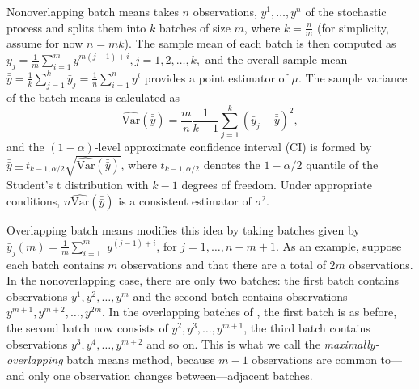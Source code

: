 \documentclass[12pt]{article}
\newcommand{\varhat}{\widehat{\mathrm{Var}}}
\newcommand{\yb}{\bar{y}}
\newcommand{\ybb}{\bar{\yb}}
\begin{document}
Nonoverlapping batch means takes $n$ observations, $y^1, \dots, y^n$ of the stochastic process and splits them into $k$ batches of size $m$, where $k = \frac{n}{m}$ (for simplicity, assume for now $n = mk$).  
The sample mean of each batch is then computed as
$
	\yb_j = \frac{1}{m} \sum_{i=1}^{m} y^{m(j-1)+i}, j = 1,2, \dots, k,
$
and the overall sample mean $\ybb = \frac{1}{k} \sum_{j=1}^k \yb_j = \frac{1}{n} \sum_{i=1}^n y^i$ provides a point estimator of $\mu$.  
The sample variance of the batch means is calculated as
\begin{equation} \label{eq:var}
	\varhat(\ybb) = \frac{m}{n}\frac{1}{k-1} \sum_{j=1}^k \left( \yb_j - \ybb \right)^2,
\end{equation}
and the $(1-\alpha)$-level approximate confidence interval (CI) is formed by $\ybb \pm t_{k-1,\alpha/2} \sqrt{\varhat(\ybb)}$, where $t_{k-1,\alpha/2}$ denotes the $1-\alpha/2$ quantile of the Student's t distribution with $k-1$ degrees of freedom.  
Under appropriate conditions, $n\varhat(\ybb)$ is a consistent estimator of $\sigma^2$.


Overlapping batch means modifies this idea by taking batches given by $\yb_j(m) = \frac{1}{m} \sum_{i=1}^{m}$ $y^{(j-1)+i}$, for $j = 1, \dots, n-m+1$.
As an example, suppose each batch contains $m$ observations and that there are a total of $2m$ observations.
In the nonoverlapping case, there are only two batches: the first batch contains observations $y^1, y^2, \dots, y^m$ and the second batch contains observations $y^{m+1}, y^{m+2}, \dots, y^{2m}$.   
In the overlapping batches of \citet{Meketon1984}, the first batch is as before, the second batch now consists of $y^2, y^3, \dots, y^{m+1}$, the third batch contains observations $y^3, y^4, \dots, y^{m+2}$ and so on.  
This is what we call the \emph{maximally-overlapping} batch means method, because $m-1$ observations are common to---and only one observation changes between---adjacent batches.  
\end{document}
